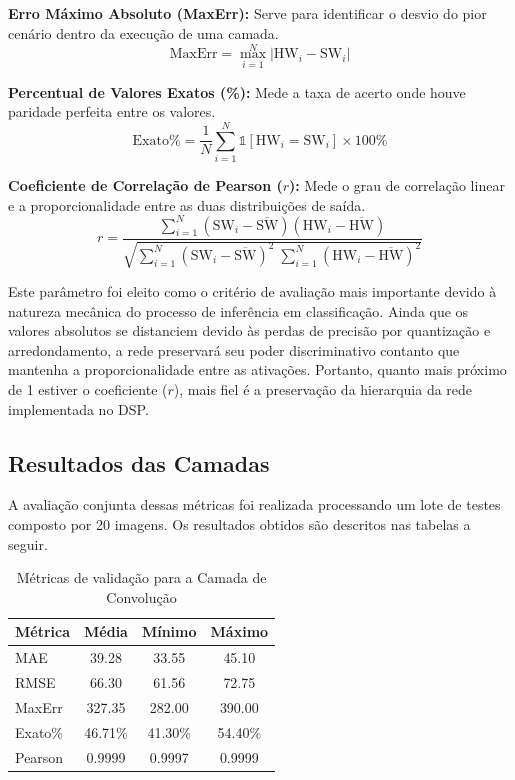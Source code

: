 \noindent\textbf{Erro Máximo Absoluto (MaxErr):} Serve para identificar o desvio do pior cenário dentro da execução de uma camada.
\begin{equation}
\text{MaxErr} = \max_{i=1}^{N} \left| \text{HW}_i - \text{SW}_i \right|
\end{equation}

\noindent\textbf{Percentual de Valores Exatos (\%):} Mede a taxa de acerto onde houve paridade perfeita entre os valores.
\begin{equation}
\text{Exato\%} = \frac{1}{N} \sum_{i=1}^{N} \mathbb{1}\left[\text{HW}_i = \text{SW}_i\right] \times 100\%
\end{equation}

\noindent\textbf{Coeficiente de Correlação de Pearson ($r$):} Mede o grau de correlação linear e a proporcionalidade entre as duas distribuições de saída.
\begin{equation}
r =
\frac{
\sum_{i=1}^{N}
\left(\mathrm{SW}_i-\overline{\mathrm{SW}}\right)
\left(\mathrm{HW}_i-\overline{\mathrm{HW}}\right)
}{
\sqrt{
\sum_{i=1}^{N}\left(\mathrm{SW}_i-\overline{\mathrm{SW}}\right)^2
\;
\sum_{i=1}^{N}\left(\mathrm{HW}_i-\overline{\mathrm{HW}}\right)^2
}
}
\label{eq:pearson}
\end{equation}

Este parâmetro foi eleito como o critério de avaliação mais importante devido à natureza mecânica do processo de inferência em classificação. Ainda que os valores absolutos se distanciem devido às perdas de precisão por quantização e arredondamento, a rede preservará seu poder discriminativo contanto que mantenha a proporcionalidade entre as ativações. Portanto, quanto mais próximo de 1 estiver o coeficiente ($r$), mais fiel é a preservação da hierarquia da rede implementada no DSP.

\subsection{Resultados das Camadas}

A avaliação conjunta dessas métricas foi realizada processando um lote de testes composto por 20 imagens. Os resultados obtidos são descritos nas tabelas a seguir.

\begin{table}[htbp]
\centering
\caption{Métricas de validação para a Camada de Convolução}
\label{tab:metricas_conv}
\begin{tabular}{lccc}
\toprule
\textbf{Métrica} & \textbf{Média} & \textbf{Mínimo} & \textbf{Máximo} \\
\midrule
MAE     & 39.28   & 33.55   & 45.10   \\
RMSE    & 66.30   & 61.56   & 72.75   \\
MaxErr  & 327.35  & 282.00  & 390.00  \\
Exato\% & 46.71\% & 41.30\% & 54.40\% \\
Pearson & 0.9999  & 0.9997  & 0.9999  \\
\bottomrule
\end{tabular}
\end{table}

